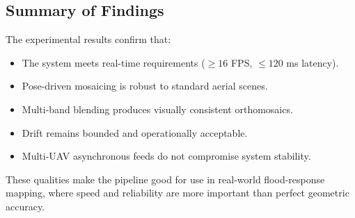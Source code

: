 \documentclass[conference]{IEEEtran}
\begin{document}
\subsection{Summary of Findings}
The experimental results confirm that:
\begin{itemize}
    \item The system meets real-time requirements ($\geq 16$ FPS, $\leq 120$ ms latency).
    \item Pose-driven mosaicing is robust to standard aerial scenes.
    \item Multi-band blending produces visually consistent orthomosaics.
    \item Drift remains bounded and operationally acceptable.
    \item Multi-UAV asynchronous feeds do not compromise system stability.
\end{itemize}
These qualities make the pipeline good for use in real-world flood-response mapping, where speed and reliability are more important than perfect geometric accuracy.



\end{document}
